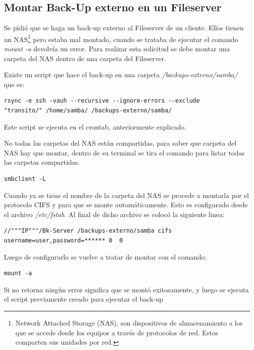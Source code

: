 \documentclass[12pt,a4paper]{article}
\begin{document}
\subsection{Montar Back-Up externo en un Fileserver} 
Se pidió que se haga un back-up externo al Fileserver de un cliente. Ellos tienen un NAS\footnote{Network Attached Storage (NAS), son dispositivos de almacenamiento a los que se accede desde los equipos a través de protocolos de red. Estos comparten sus unidades por red.}  pero estaba mal montado, cuando se trataba de ejecutar el comando \textit{mount -a} devolvía un error. Para realizar esta solicitud se debe montar una carpeta del NAS dentro de una carpeta del Fileserver.

Existe un script que hace el back-up en una carpeta \textit{/backups-externo/samba/} que es:

\begin{lstlisting}
rsync -e ssh -vauh --recursive --ignore-errors --exclude 
"transito/" /home/samba/ /backups-externo/samba/
\end{lstlisting}

Este script se ejecuta en el crontab, anteriormente explicado.

No todas las carpetas del NAS están compartidas, para saber que carpeta del NAS hay que montar, dentro de su terminal se tira el comando para listar todas las carpetas compartidas.

\begin{lstlisting}
smbclient -L 
\end{lstlisting}
 
Cuando ya se tiene el nombre de la carpeta del NAS se procede a montarla por el protocolo CIFS y para que se monte automáticamente. Esto es configurado desde el archivo \textit{/etc/fstab}. Al final de dicho archivo se colocó la siguiente linea:

\begin{lstlisting}
//"""IP"""/Bk-Server /backups-externo/samba	cifs	
username=user,password=****** 0  0 
\end{lstlisting}

Luego de configurarlo se vuelve a tratar de montar con el comando:

\begin{lstlisting}
mount -a
\end{lstlisting}

Si no retorna ningún error significa que se montó exitosamente, y luego se ejecuta el script previamente creado para ejecutar el back-up
\end{document}
